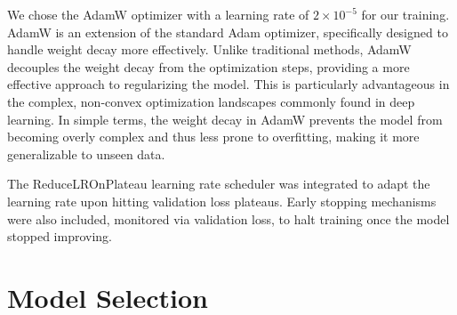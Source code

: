 \documentclass[a4paper,12pt,openright]{book}
\begin{document}
We chose the AdamW optimizer with a learning rate of \(2 \times 10^{-5}\) for our training. AdamW is an extension of the standard Adam optimizer, specifically designed to handle weight decay more effectively. Unlike traditional methods, AdamW decouples the weight decay from the optimization steps, providing a more effective approach to regularizing the model. This is particularly advantageous in the complex, non-convex optimization landscapes commonly found in deep learning. In simple terms, the weight decay in AdamW prevents the model from becoming overly complex and thus less prone to overfitting, making it more generalizable to unseen data. 

The ReduceLROnPlateau learning rate scheduler was integrated to adapt the learning rate upon hitting validation loss plateaus. Early stopping mechanisms were also included, monitored via validation loss, to halt training once the model stopped improving.


\section{Model Selection}
\label{model_selection}
\end{document}
